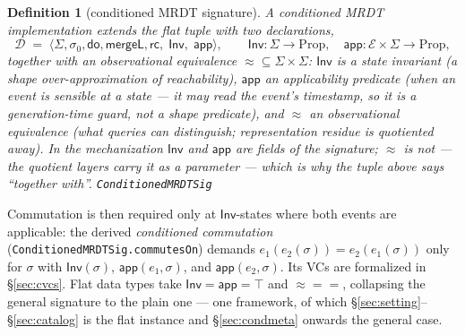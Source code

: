 \documentclass[11pt]{article}
\newtheorem{definition}[theorem]{Definition}
\newcommand{\rcrel}{\mathsf{rc}}                 %
\newcommand{\mergeL}{\mathsf{mergeL}}
\newcommand{\Sinit}{\sigma_0}
\newcommand{\lean}[1]{\texttt{#1}}
\newcommand{\M}[1]{\mathcal{#1}}
\newcommand{\eqobs}{\approx}
\newcommand{\Inv}{\mathsf{Inv}}
\newcommand{\app}{\mathsf{app}}
\begin{document}
\begin{definition}[conditioned MRDT signature]
\label{def:condsig}
A \emph{conditioned} MRDT implementation extends the flat tuple with two
declarations,
\[
  \M{D} \;=\; \langle \Sigma, \Sinit, \mathsf{do}, \mergeL, \rcrel,\;
  \Inv,\; \app \rangle, \qquad
  \Inv : \Sigma \to \mathrm{Prop}, \quad
  \app : \M{E} \times \Sigma \to \mathrm{Prop},
  \]
together with an observational equivalence
${\eqobs} \subseteq \Sigma \times \Sigma$: $\Inv$ is a state invariant
(a shape over-approximation of reachability), $\app$ an applicability
predicate (when an event is sensible at a state --- it may read the
event's timestamp, so it is a generation-time guard, not a shape
predicate), and $\eqobs$ an observational equivalence (what queries can
distinguish; representation residue is quotiented away). In the
mechanization $\Inv$ and $\app$ are fields of the signature; $\eqobs$
is not --- the quotient layers carry it as a parameter --- which is why
the tuple above says ``together with''.
\hfill\lean{ConditionedMRDTSig}
\end{definition}

Commutation is then required only at $\Inv$-states where both events
are applicable: the derived \emph{conditioned commutation}
(\lean{ConditionedMRDTSig.commutesOn}) demands
$e_1(e_2(\sigma)) = e_2(e_1(\sigma))$ only for $\sigma$ with
$\Inv(\sigma)$, $\app(e_1,\sigma)$, and $\app(e_2,\sigma)$. Its VCs are
formalized in \S\ref{sec:cvcs}. Flat data types take
$\Inv = \app = \top$ and ${\eqobs} = {=}$, collapsing the general
signature to the plain one --- one framework, of which
\S\ref{sec:setting}--\S\ref{sec:catalog} is the flat instance and
\S\ref{sec:condmeta} onwards the general case.
\end{document}
